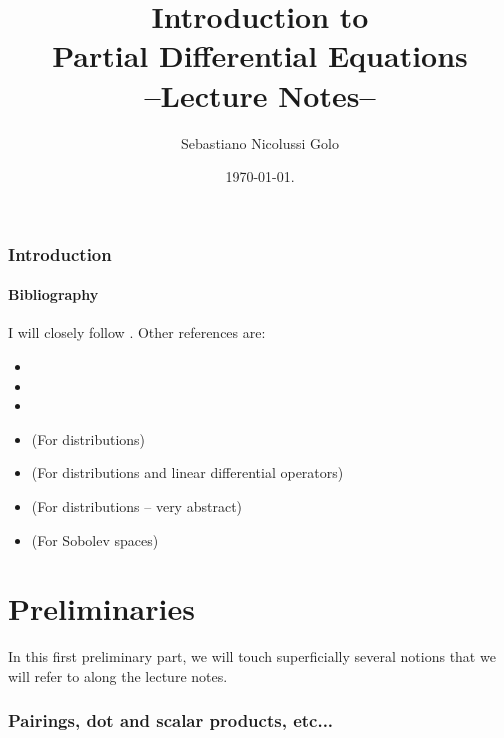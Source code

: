 \documentclass[a4paper,9pt]{amsart}
\title[Introduction to PDE]{Introduction to\\Partial Differential Equations\\--Lecture Notes--}
\author[Nicolussi Golo]{Sebastiano Nicolussi Golo}
\date{\today. \IfFileExists{./.gittex}{}{}}
\theoremstyle{plain}
\theoremstyle{definition}
\theoremstyle{remark}
\begin{document}
\maketitle

\setcounter{tocdepth}{2}
{}
\tableofcontents

\section*{Introduction}


\subsection{Bibliography}
I will closely follow \cite{MR2597943}.
Other references are:
\begin{itemize}
\item {}
\item {}
\item {}
\item (For distributions) 
\item (For distributions and linear differential operators) 
\item (For distributions -- very abstract) 
\item (For Sobolev spaces) 
\end{itemize}



\newpage
\setcounter{part}{-1}
\part{Preliminaries}

In this first preliminary part, we will touch superficially several notions that we will refer to along the lecture notes.

\section{Pairings, dot and scalar products, etc...}
\end{document}
